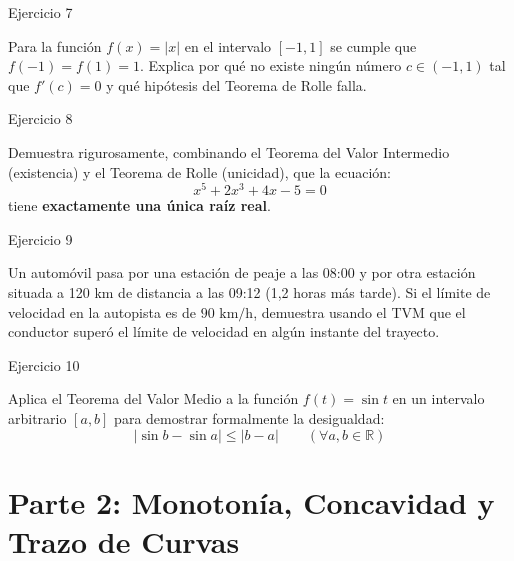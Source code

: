 \documentclass[aspectratio=169]{beamer}
\begin{document}
\begin{frame}{Ejercicio 7}
  \begin{mwejercicio}
    Para la función $f(x) = |x|$ en el intervalo $[-1, 1]$ se cumple que $f(-1) = f(1) = 1$. Explica por qué no existe ningún número $c \in (-1, 1)$ tal que $f'(c) = 0$ y qué hipótesis del Teorema de Rolle falla.
  \end{mwejercicio}
  \vspace{3.5cm}
\end{frame}
\begin{frame}{Ejercicio 8}
  \begin{mwejercicio}
    Demuestra rigurosamente, combinando el Teorema del Valor Intermedio (existencia) y el Teorema de Rolle (unicidad), que la ecuación:
    $$x^5 + 2x^3 + 4x - 5 = 0$$
    tiene \textbf{exactamente una única raíz real}.
  \end{mwejercicio}
  \vspace{3.5cm}
\end{frame}
\begin{frame}{Ejercicio 9}
  \begin{mwejercicio}
    Un automóvil pasa por una estación de peaje a las 08:00 y por otra estación situada a 120 km de distancia a las 09:12 (1,2 horas más tarde). Si el límite de velocidad en la autopista es de $90\text{ km/h}$, demuestra usando el TVM que el conductor superó el límite de velocidad en algún instante del trayecto.
  \end{mwejercicio}
  \vspace{3.5cm}
\end{frame}
\begin{frame}{Ejercicio 10}
  \begin{mwejercicio}
    Aplica el Teorema del Valor Medio a la función $f(t) = \sin t$ en un intervalo arbitrario $[a, b]$ para demostrar formalmente la desigualdad:
    $$|\sin b - \sin a| \le |b - a| \qquad (\forall a, b \in \mathbb{R})$$
  \end{mwejercicio}
  \vspace{3.5cm}
\end{frame}


\section{Parte 2: Monotonía, Concavidad y Trazo de Curvas}
\end{document}
